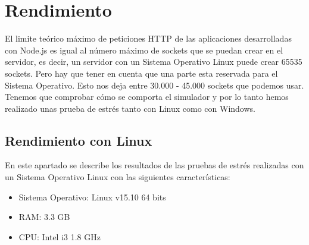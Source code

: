 \section{Rendimiento}

El limite teórico máximo de peticiones HTTP de las aplicaciones desarrolladas con Node.js es igual al número máximo de sockets que se puedan crear en el servidor, es decir, un servidor con un Sistema Operativo Linux puede crear 65535 sockets. Pero hay que tener en cuenta que una parte esta reservada para el Sistema Operativo. Esto nos deja entre 30.000 - 45.000 sockets que podemos usar. Tenemos que comprobar cómo se comporta el simulador y por lo tanto hemos realizado unas prueba de estrés tanto con Linux como con Windows.

\subsection{Rendimiento con Linux}

En este apartado se describe los resultados de las pruebas de estrés realizadas con un Sistema Operativo Linux con las siguientes características:

\begin{itemize}
	\item Sistema Operativo: Linux v15.10 64 bits
	\item RAM: 3.3 GB
	\item CPU: Intel i3 1.8 GHz
\end{itemize}

